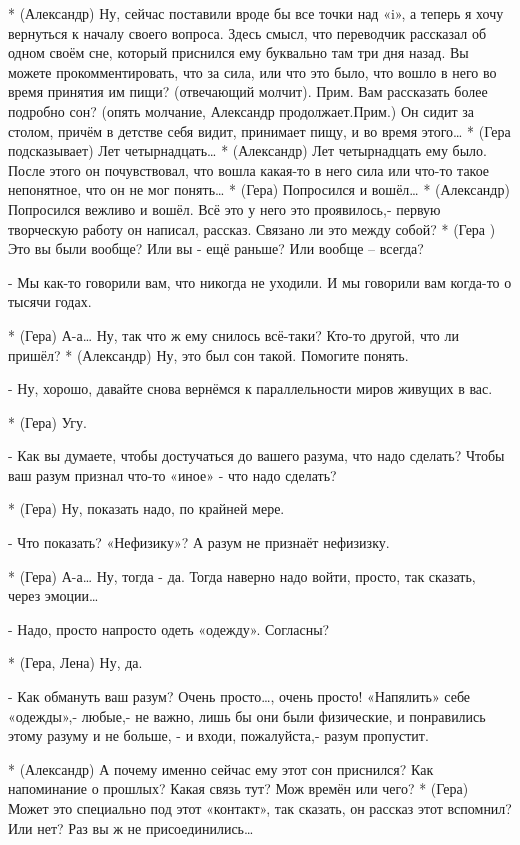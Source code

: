 * (Александр) Ну, сейчас поставили вроде бы все точки над «i», а теперь я хочу вернуться к началу своего вопроса. Здесь смысл, что переводчик рассказал об одном своём сне, который приснился ему буквально там три дня назад. Вы можете прокомментировать, что за сила, или что это было, что вошло в него во время принятия им пищи? (отвечающий молчит). Прим. Вам рассказать более подробно сон? (опять молчание, Александр продолжает.Прим.)  Он сидит за столом, причём в детстве себя видит, принимает пищу, и во время этого…
* (Гера подсказывает) Лет четырнадцать…
* (Александр) Лет четырнадцать ему было. После этого он почувствовал, что вошла какая-то в него сила или что-то такое непонятное, что он не мог понять…
* (Гера) Попросился и вошёл…
* (Александр) Попросился вежливо и вошёл. Всё это у него это проявилось,- первую творческую работу он написал, рассказ. Связано ли это между собой?
* (Гера ) Это вы были  вообще? Или вы - ещё раньше? Или вообще – всегда?

- Мы  как-то говорили вам, что никогда не уходили. И мы говорили вам когда-то о тысячи годах.

* (Гера) А-а…  Ну, так что ж ему снилось всё-таки? Кто-то другой, что ли пришёл?
* (Александр) Ну, это был сон такой. Помогите понять.

- Ну, хорошо, давайте снова вернёмся к параллельности миров живущих в вас.

* (Гера) Угу.

- Как вы думаете, чтобы достучаться до вашего разума, что надо сделать? Чтобы ваш разум признал что-то «иное» - что надо сделать?

* (Гера) Ну, показать надо, по крайней мере.

- Что показать? «Нефизику»? А разум не признаёт нефизизку.

* (Гера) А-а… Ну, тогда - да. Тогда наверно надо войти, просто, так сказать, через эмоции…

-  Надо, просто напросто одеть «одежду». Согласны?

* (Гера, Лена) Ну, да.

- Как обмануть ваш разум? Очень просто…, очень просто! «Напялить» себе «одежды»,- любые,- не важно, лишь бы они были физические, и понравились этому разуму и не больше, - и входи, пожалуйста,-  разум пропустит.

* (Александр) А почему  именно сейчас ему этот сон приснился? Как напоминание о прошлых? Какая связь тут? Мож времён или чего?
* (Гера) Может это специально под этот «контакт», так сказать, он рассказ этот вспомнил? Или нет? Раз вы ж не присоединились…

